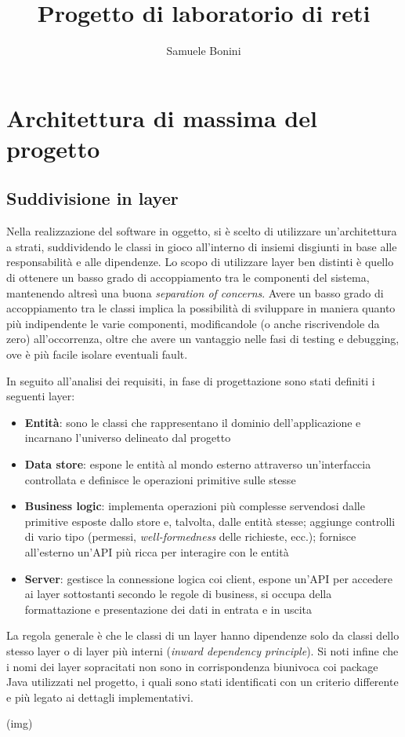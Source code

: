 \documentclass[a4paper,8pt]{article} %
\title{Progetto di laboratorio di reti} %
\author{Samuele Bonini}
\date{}
\begin{document}
\maketitle %



\tableofcontents %
\setlength{\parskip}{0.5em}

\section{Architettura di massima del progetto} %
\subsection{Suddivisione in layer}
Nella realizzazione del software in oggetto, si è scelto di utilizzare un'architettura a strati, suddividendo le classi in gioco
all'interno di insiemi disgiunti in base alle responsabilità e alle dipendenze. Lo scopo di utilizzare layer ben distinti è quello
di ottenere un basso grado di accoppiamento tra le componenti del sistema, mantenendo altresì una buona  \emph{separation of concerns}.
Avere un basso grado di accoppiamento tra le classi implica la possibilità di sviluppare in maniera quanto più indipendente
le varie componenti, modificandole (o anche riscrivendole da zero) all'occorrenza, oltre che avere un vantaggio nelle fasi di testing e debugging, ove è
più facile isolare eventuali fault.
\par
In seguito all'analisi dei requisiti, in fase di progettazione sono stati definiti i seguenti layer:
\begin{itemize}
    \item \textbf{Entità}: sono le classi che rappresentano il dominio dell'applicazione e incarnano l'universo delineato dal progetto
    \item \textbf{Data store}: espone le entità al mondo esterno attraverso un'interfaccia controllata e definisce le operazioni primitive sulle stesse
    \item \textbf{Business logic}: implementa operazioni più complesse servendosi dalle primitive esposte dallo store e, talvolta, dalle entità stesse;
          aggiunge controlli di vario tipo (permessi, \emph{well-formedness} delle richieste, ecc.); fornisce all'esterno un'API più ricca per interagire con le entità
    \item \textbf{Server}: gestisce la connessione logica coi client, espone un'API per accedere ai layer sottostanti secondo le regole di business, si occupa della
          formattazione e presentazione dei dati in entrata e in uscita
\end{itemize}
La regola generale è che le classi di un layer hanno dipendenze solo da classi dello stesso layer o di layer più interni (\emph{inward dependency principle}).
Si noti infine che i nomi dei layer sopracitati non sono in corrispondenza biunivoca coi package Java utilizzati nel progetto, i quali sono stati
identificati con un criterio differente e più legato ai dettagli implementativi.
\par(img)
\end{document}

